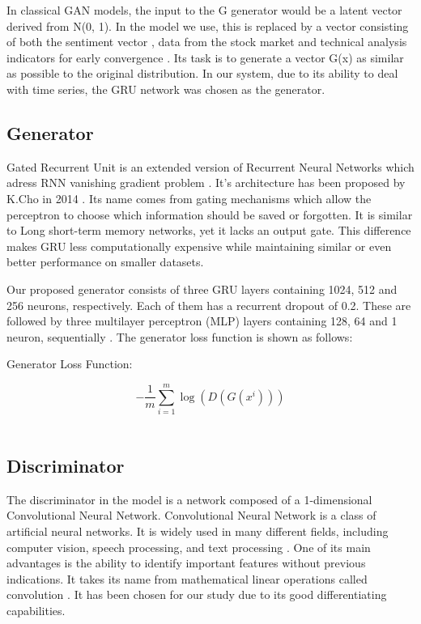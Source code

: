 \documentclass[11pt]{article} %
\begin{document}
In classical GAN models, the input to the G generator would be a latent vector derived from N(0, 1). In the model we use, this is replaced by a vector consisting of both the sentiment vector \cite{gan-stock}, data from the stock market and technical analysis indicators for early convergence \cite{gan-stock2}. Its task is to generate a vector G(x) as similar as possible to the original distribution. In our system, due to its ability to deal with time series, the GRU network was chosen as the generator. 


\subsection{Generator}

Gated Recurrent Unit is an extended version of Recurrent Neural Networks which adress RNN vanishing gradient problem \cite{gru2}.
It's architecture has been proposed by K.Cho in 2014 \cite{gru3}. Its name comes from gating mechanisms which allow the perceptron to choose which information should be saved or forgotten. It is similar to  Long short-term memory networks, yet it lacks an output gate. This difference makes GRU less computationally expensive while maintaining similar or even better performance on smaller datasets. 

Our proposed generator consists of three GRU layers containing 1024, 512 and 256 neurons, respectively. Each of them has a recurrent dropout of 0.2. These are followed by three multilayer perceptron (MLP) layers containing 128, 64 and 1 neuron, sequentially \cite{gan-stock}\cite{gan-stock2}. 
The generator loss function is shown as follows: 

\begin{center}   Generator Loss Function:  \end{center}
\begin{equation}
-\frac{1}{m} \sum_{i=1}^{m} \log \left(D\left(G\left(x^{i}\right)\right)\right)
\end{equation}\\

\subsection{Discriminator}

The discriminator in the model is a network composed of a 1-dimensional Convolutional Neural Network. 
Convolutional Neural Network is a class of artificial neural networks. It is widely used in many different fields, including computer vision, speech processing, and text processing \cite{cnn1}. One of its main advantages is the ability to identify important features without previous indications. It takes its name from mathematical linear operations called convolution \cite{cnn2}. It has been chosen for our study due to its good differentiating capabilities.
\end{document}
